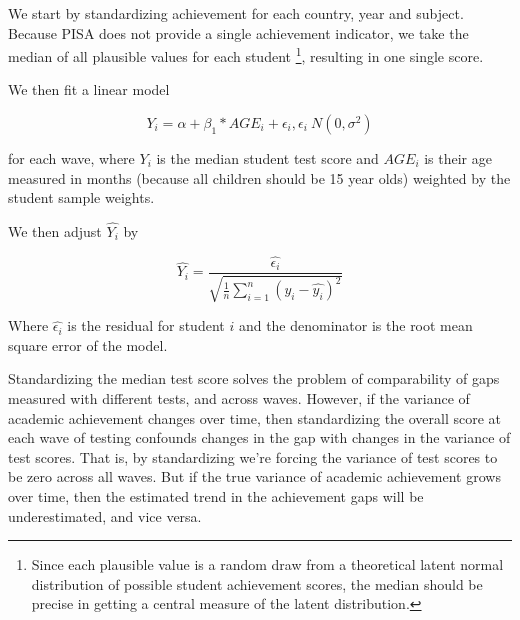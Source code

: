\documentclass[11pt, a4paper]{article}\usepackage[]{graphicx}\usepackage[]{color}
\begin{document}
We start by standardizing achievement for each country, year and subject. Because PISA does not provide a single achievement indicator, we take the median of all plausible values for each student \footnote{Since each plausible value is a random draw from a theoretical latent normal distribution of possible student achievement scores, the median should be precise in getting a central measure of the latent distribution.}, resulting in one single score.

We then fit a linear model

\begin{equation}
Y_i = \alpha + \beta_1 * AGE_i + \epsilon_i, \epsilon_i ~ N(0, \sigma^2)
\end{equation}

for each wave,  where \begin{math}Y_i\end{math} is the median student test score and \begin{math}AGE_i\end{math} is their age measured in months (because all children should be 15 year olds) weighted by the student sample weights.

We then adjust \begin{math} \hat{Y_i} \end{math} by

\begin{equation}
\hat{Y_i} = \frac{\hat{\epsilon_i}}{\sqrt{\frac{1}{n} \sum_{i=1}^{n} (y_i - \hat{y_i})^2}}
\end{equation}


Where \begin{math}\hat{\epsilon_i}\end{math} is the residual for student \begin{math}i\end{math} and the denominator is the root mean square error of the model.

Standardizing the median test score solves the problem of comparability of gaps measured with different tests, and across waves. However, if the variance of academic achievement changes over time, then standardizing the overall score at each wave of testing confounds changes in the gap with changes in the variance of test scores. That is, by standardizing we're forcing the variance of test scores to be zero across all waves. But if the true variance of academic achievement grows over time, then the estimated trend in the achievement gaps will be underestimated, and vice versa.
\end{document}
